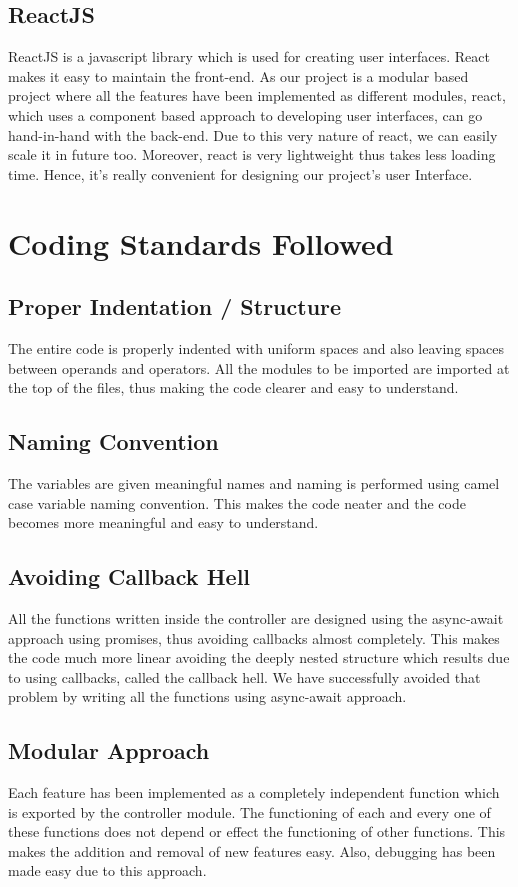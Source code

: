 \subsection{ReactJS}
ReactJS is a javascript library which is used for creating user interfaces. React makes it easy to maintain the front-end. As our project is a modular based project where all the features have been implemented as different modules, react, which uses a component based approach to developing user interfaces, can go hand-in-hand with the back-end. Due to this very nature of react, we can easily scale it in future too. Moreover, react is very lightweight thus takes less loading time. Hence, it’s really convenient for designing our project’s user Interface.


\section{Coding Standards Followed}

\subsection{Proper Indentation / Structure}
The entire code is properly indented with uniform spaces and also leaving spaces between operands and operators. All the modules to be imported are imported at the top of the files, thus making the code clearer and easy to understand.

\subsection{Naming Convention}
The variables are given meaningful names and naming is performed using camel case variable naming convention. This makes the code neater and the code becomes more meaningful and easy to understand.

\subsection{Avoiding Callback Hell}
All the functions written inside the controller are designed using the async-await approach using promises, thus avoiding callbacks almost completely. This makes the code much more linear avoiding the deeply nested structure which results due to using callbacks, called the callback hell. We have successfully avoided that problem by writing all the functions using async-await approach.

\subsection{Modular Approach}
Each feature has been implemented as a completely independent function which is exported by the controller module. The functioning of each and every one of these functions does not depend or effect the functioning of other functions. This makes the addition and removal of new features easy. Also, debugging has been made easy due to this approach.

